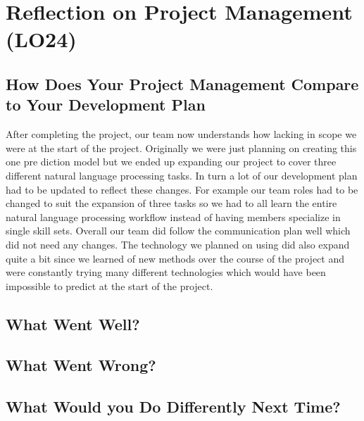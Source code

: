\documentclass{article}
\begin{document}
\section{Reflection on Project Management (LO24)}


\subsection{How Does Your Project Management Compare to Your Development Plan}

After completing the project, our team now understands how lacking in scope we were at the start of the project. Originally we were just planning on creating this one pre  diction model but we ended up expanding our project to cover three different natural language processing tasks. In turn a lot of our development plan had to be updated to reflect these changes. For example our team roles had to be changed to suit the expansion of three tasks so we had to all learn the entire natural language processing workflow instead of having members specialize in single skill sets. Overall our team did follow the communication plan well which did not need any changes. The technology we planned on using did also expand quite a bit since we learned of new methods over the course of the project and were constantly trying many different technologies which would have been impossible to predict at the start of the project.

\subsection{What Went Well?}


\subsection{What Went Wrong?}


\subsection{What Would you Do Differently Next Time?}
\end{document}
